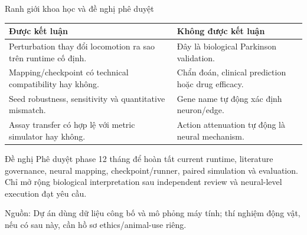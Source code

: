 \documentclass[10pt,aspectratio=169]{beamer}
\newcommand{\source}[1]{\par\vfill{\fontsize{6.0}{7}\selectfont\color{gray}Nguồn: #1\par}}
\newcommand{\smallgap}{\vspace{0.18cm}}
\begin{document}
\begin{frame}{Ranh giới khoa học và đề nghị phê duyệt}
\renewcommand{\arraystretch}{1.23}\small
\begin{tabular}{@{}L{7.1cm}L{7.1cm}@{}}
\toprule
\textbf{Được kết luận} & \textbf{Không được kết luận}\\\midrule
Perturbation thay đổi locomotion ra sao trên runtime cố định. & Đây là biological Parkinson validation.\\
Mapping/checkpoint có technical compatibility hay không. & Chẩn đoán, clinical prediction hoặc drug efficacy.\\
Seed robustness, sensitivity và quantitative mismatch. & Gene name tự động xác định neuron/edge.\\
Assay transfer có hợp lệ với metric simulator hay không. & Action attenuation tự động là neural mechanism.\\\bottomrule
\end{tabular}
\smallgap
\begin{block}{Đề nghị}
Phê duyệt phase 12 tháng để hoàn tất current runtime, literature governance, neural mapping, checkpoint/runner, paired simulation và evaluation. Chỉ mở rộng biological interpretation sau independent review và neural-level execution đạt yêu cầu.
\end{block}
\source{Dự án dùng dữ liệu công bố và mô phỏng máy tính; thí nghiệm động vật, nếu có sau này, cần hồ sơ ethics/animal-use riêng.}
\end{frame}
\end{document}
